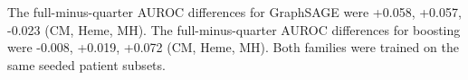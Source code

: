 The full-minus-quarter AUROC differences for GraphSAGE were +0.058, +0.057, -0.023 (CM, Heme, MH). The full-minus-quarter AUROC differences for boosting were -0.008, +0.019, +0.072 (CM, Heme, MH). Both families were trained on the same seeded patient subsets.
